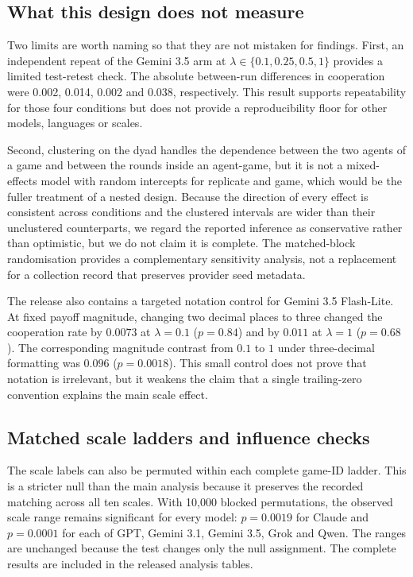 \documentclass[openacc]{rsproca_new}
\newcommand{\lam}{\lambda}
\begin{document}
\subsection{What this design does not measure}\label{appendix:robust_gaps}

Two limits are worth naming so that they are not mistaken for findings.
First, an independent repeat of the Gemini 3.5 arm at $\lam \in
\{0.1,0.25,0.5,1\}$ provides a limited test-retest check. The absolute
between-run differences in cooperation were 0.002, 0.014, 0.002 and 0.038,
respectively. This result supports repeatability for those four conditions but
does not provide a reproducibility floor for other models, languages or scales.

Second, clustering on the dyad handles the dependence between the two agents of
a game and between the rounds inside an agent-game, but it is not a
mixed-effects model with random intercepts for replicate and game, which would
be the fuller treatment of a nested design. Because the direction of every
effect is consistent across conditions and the clustered intervals are wider
than their unclustered counterparts, we regard the reported inference as
conservative rather than optimistic, but we do not claim it is complete.
The matched-block randomisation provides a complementary sensitivity analysis,
not a replacement for a collection record that preserves provider seed metadata.

The release also contains a targeted notation control for Gemini 3.5 Flash-Lite.
At fixed payoff magnitude, changing two decimal places to three changed the
cooperation rate by $0.0073$ at $\lambda=0.1$ ($p=0.84$) and by $0.011$ at
$\lambda=1$ ($p=0.68$). The corresponding magnitude contrast from $0.1$ to $1$
under three-decimal formatting was $0.096$ ($p=0.0018$). This small control
does not prove that notation is irrelevant, but it weakens the claim that a
single trailing-zero convention explains the main scale effect.


\subsection{Matched scale ladders and influence checks}\label{appendix:robust_ladders}

The scale labels can also be permuted within each complete game-ID ladder. This
is a stricter null than the main analysis because it preserves the recorded
matching across all ten scales. With 10,000 blocked permutations, the observed
scale range remains significant for every model: $p=0.0019$ for Claude and
$p=0.0001$ for each of GPT, Gemini 3.1, Gemini 3.5, Grok and Qwen. The ranges
are unchanged because the test changes only the null assignment. The complete
results are included in the released analysis tables.
\end{document}
